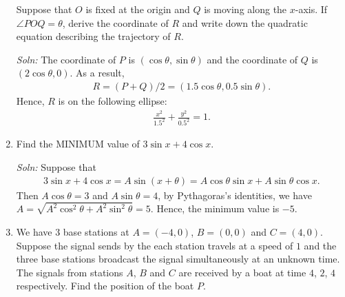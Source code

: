 \documentclass{article}
\begin{document}
\begin{enumerate}
Suppose that $O$ is fixed at the origin and $Q$ is moving along the $x$-axis. If $\angle POQ = \theta$, derive the coordinate of $R$ and write down the quadratic equation describing the trajectory of $R$.
\begin{figure}[ht]
  \centering
\end{figure}

\emph{Soln:} The coordinate of $P$ is $(\cos \theta, \sin \theta)$ and the coordinate of $Q$ is $(2\cos\theta, 0)$. As a result, 
\begin{align*}
  R = (P+Q)/2 = (1.5\cos\theta, 0.5\sin\theta).
\end{align*}
Hence, $R$ is on the following ellipse:
\begin{align*}
  \frac{x^2}{1.5^2}+\frac{y^2}{0.5^2} = 1.
\end{align*}
\newpage

\item Find the MINIMUM value of $3\sin x + 4\cos x$.
  
\emph{Soln:} Suppose that 
\begin{align*}
  3\sin x + 4\cos x = A \sin (x+\theta) = A\cos\theta\sin x + A \sin\theta \cos x.
\end{align*}
Then $A\cos \theta = 3$ and $A\sin \theta = 4$, by Pythagoras's identities, we have $A = \sqrt{A^2\cos^2\theta + A^2 \sin^2\theta}=5$. Hence, the minimum value is $-5$.

  \newpage


\item We have 3 base stations at $A = (-4,0)$, $B = (0,0)$ and $C = (4,0)$. Suppose the signal sends by the each station travels at a speed of $1$ and the three base stations broadcast the signal simultaneously at an unknown time. The signals from stations $A$, $B$ and $C$ are received by a boat at time $4$, $2$, $4$ respectively. Find the position of the boat $P$.



\end{enumerate}
\end{document}
